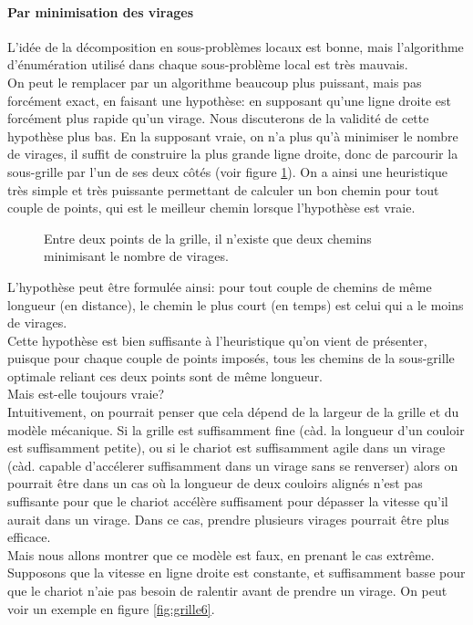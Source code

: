 \paragraph{Par minimisation des virages}
L'idée de la décomposition en sous-problèmes locaux est bonne, mais l'algorithme d'énumération utilisé dans chaque sous-problème local est très mauvais.\\
On peut le remplacer par un algorithme beaucoup plus puissant, mais pas forcément exact, en faisant une hypothèse: en supposant qu'une ligne droite est forcément plus rapide qu'un virage. Nous discuterons de la validité de cette hypothèse plus bas. En la supposant vraie, on n'a plus qu'à minimiser le nombre de virages, il suffit de construire la plus grande ligne droite, donc de parcourir la sous-grille par l'un de ses deux côtés (voir figure \ref{fig:grille5}). On a ainsi une heuristique très simple et très puissante permettant de calculer un bon chemin pour tout couple de points, qui est le meilleur chemin lorsque l'hypothèse est vraie.\\
\begin{figure}
	\centering
	
	\caption{Entre deux points de la grille, il n'existe que deux chemins minimisant le nombre de virages.}
	\label{fig:grille5}
\end{figure}
L'hypothèse peut être formulée ainsi: pour tout couple de chemins de même longueur (en distance), le chemin le plus court (en temps) est celui qui a le moins de virages.\\
Cette hypothèse est bien suffisante à l'heuristique qu'on vient de présenter, puisque pour chaque couple de points imposés, tous les chemins de la sous-grille optimale reliant ces deux points sont de même longueur.\\
Mais est-elle toujours vraie?\\
Intuitivement, on pourrait penser que cela dépend de la largeur de la grille et du modèle mécanique. Si la grille est suffisamment fine (càd. la longueur d'un couloir est suffisamment petite), ou si le chariot est suffisamment agile dans un virage (càd. capable d'accélerer suffisamment dans un virage sans se renverser) alors on pourrait être dans un cas où la longueur de deux couloirs alignés n'est pas suffisante pour que le chariot accélère suffisament pour dépasser la vitesse qu'il aurait dans un virage. Dans ce cas, prendre plusieurs virages pourrait être plus efficace.\\
Mais nous allons montrer que ce modèle est faux, en prenant le cas extrême. Supposons que la vitesse en ligne droite est constante, et suffisamment basse pour que le chariot n'aie pas besoin de ralentir avant de prendre un virage. On peut voir un exemple en figure \ref{fig:grille6}.
